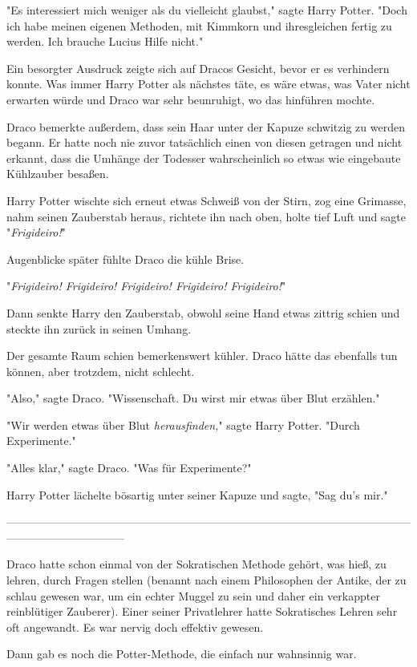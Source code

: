 {"Es interessiert mich weniger als du vielleicht glaubst," sagte Harry Potter. "Doch ich habe meinen eigenen Methoden, mit Kimmkorn und ihresgleichen fertig zu werden. Ich brauche Lucius Hilfe nicht."

Ein besorgter Ausdruck zeigte sich auf Dracos Gesicht, bevor er es verhindern konnte. Was immer Harry Potter als nächstes täte, es wäre etwas, was Vater nicht erwarten würde und Draco war sehr beunruhigt, wo das hinführen mochte.

Draco bemerkte außerdem, dass sein Haar unter der Kapuze schwitzig zu werden begann. Er hatte noch nie zuvor tatsächlich einen von diesen getragen und nicht erkannt, dass die Umhänge der Todesser wahrscheinlich so etwas wie eingebaute Kühlzauber besaßen.

Harry Potter wischte sich erneut etwas Schweiß von der Stirn, zog eine Grimasse, nahm seinen Zauberstab heraus, richtete ihn nach oben, holte tief Luft und sagte "\emph{Frigideiro!}"

Augenblicke später fühlte Draco die kühle Brise.

"\emph{Frigideiro! Frigideiro! Frigideiro! Frigideiro! Frigideiro!}"

Dann senkte Harry den Zauberstab, obwohl seine Hand etwas zittrig schien und steckte ihn zurück in seinen Umhang.

Der gesamte Raum schien bemerkenswert kühler. Draco hätte das ebenfalls tun können, aber trotzdem, nicht schlecht.

"Also," sagte Draco. "Wissenschaft. Du wirst mir etwas über Blut erzählen."

"Wir werden etwas über Blut \emph{herausfinden,}" sagte Harry Potter. "Durch Experimente."

"Alles klar," sagte Draco. "Was für Experimente?"

Harry Potter lächelte bösartig unter seiner Kapuze und sagte, "Sag du's mir."

--------------------------------------------------------------------------------------------------------------------------------------------

Draco hatte schon einmal von der Sokratischen Methode gehört, was hieß, zu lehren, durch Fragen stellen (benannt nach einem Philosophen der Antike, der zu schlau gewesen war, um ein echter Muggel zu sein und daher ein verkappter reinblütiger Zauberer). Einer seiner Privatlehrer hatte Sokratisches Lehren sehr oft angewandt. Es war nervig doch effektiv gewesen.

Dann gab es noch die Potter-Methode, die einfach nur wahnsinnig war.

}
